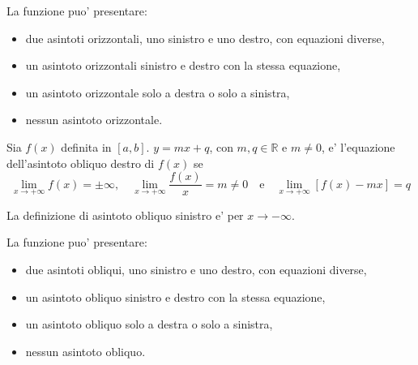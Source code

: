 \begin{property}
    La funzione puo' presentare:
    \begin{itemize}
        \item due asintoti orizzontali, uno sinistro e uno destro, con equazioni diverse,
        \item un asintoto orizzontali sinistro e destro con la stessa equazione,
        \item un asintoto orizzontale solo a destra o solo a sinistra,
        \item nessun asintoto orizzontale.
    \end{itemize}
\end{property}

\begin{definition}
    Sia $f(x)$ definita in $[a,b]$. $y=mx+q$, con $m,q\in\mathbb R$ e $m\neq 0$, e' l'equazione dell'asintoto obliquo destro di $f(x)$ se
    \begin{equation*}
        \lim_{x\rightarrow+\infty}f(x)=\pm\infty,\quad \lim_{x\rightarrow+\infty}\frac{f(x)}{x}=m\neq 0\quad \text{e}\quad \lim_{x\rightarrow+\infty}[f(x)-mx]=q
    \end{equation*}
\end{definition}

La definizione di asintoto obliquo sinistro e' per $x\rightarrow-\infty$.

\begin{property}
    La funzione puo' presentare:
    \begin{itemize}
        \item due asintoti obliqui, uno sinistro e uno destro, con equazioni diverse,
        \item un asintoto obliquo sinistro e destro con la stessa equazione,
        \item un asintoto obliquo solo a destra o solo a sinistra,
        \item nessun asintoto obliquo.
    \end{itemize}
\end{property}